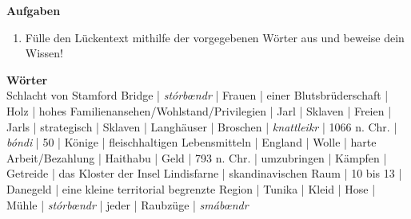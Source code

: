 \documentclass[12pt,a4paper,ngerman,openany]{book}
\newcommand{\aufgaben}[1]{
  \begin{tcolorbox}
    \textbf{Aufgaben}
    \begin{enumerate}
      #1
    \end{enumerate}
  \end{tcolorbox}
} %
\begin{document}

\aufgaben{
  \item Fülle den Lückentext mithilfe der vorgegebenen Wörter aus und beweise dein Wissen!
}

\begin{tcolorbox}
  \textbf{Wörter}\\
  Schlacht von Stamford Bridge | \textit{stórbœndr} | Frauen | einer Blutsbrüderschaft | Holz | hohes Familienansehen/Wohlstand/Privilegien | Jarl | Sklaven | Freien | Jarls | strategisch | Sklaven | Langhäuser | Broschen | \textit{knattleikr} | 1066 n. Chr. | \textit{bóndi} | 50 | Könige | fleischhaltigen Lebensmitteln | England | Wolle | harte Arbeit/Bezahlung | Haithabu | Geld | 793 n. Chr. | umzubringen | Kämpfen | Getreide | das Kloster der Insel Lindisfarne | skandinavischen Raum | 10 bis 13 | Danegeld | eine kleine territorial begrenzte Region | Tunika | Kleid | Hose | Mühle | \textit{stórbœndr} | jeder | Raubzüge | \textit{smábœndr}
\end{tcolorbox}
\end{document}
